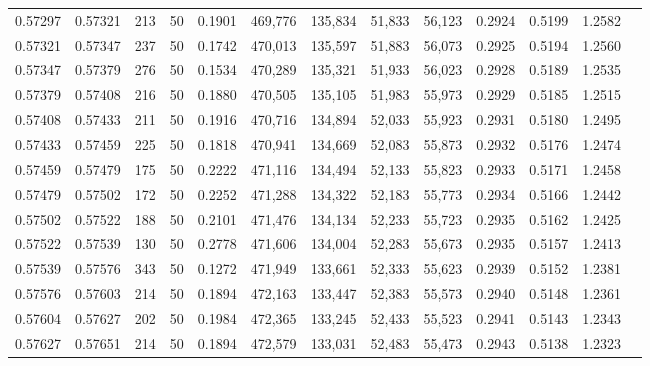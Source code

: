 \begin{tabular}{rrrrrrrrrrrrr}
0.57297 & 0.57321 &   213 &  50 &                                     0.1901 & 469,776 & 135,834 &  51,833 &  56,123 & 0.2924 & 0.5199 & 1.2582 \\
0.57321 & 0.57347 &   237 &  50 &                                     0.1742 & 470,013 & 135,597 &  51,883 &  56,073 & 0.2925 & 0.5194 & 1.2560 \\
0.57347 & 0.57379 &   276 &  50 &                                     0.1534 & 470,289 & 135,321 &  51,933 &  56,023 & 0.2928 & 0.5189 & 1.2535 \\
0.57379 & 0.57408 &   216 &  50 &                                     0.1880 & 470,505 & 135,105 &  51,983 &  55,973 & 0.2929 & 0.5185 & 1.2515 \\
0.57408 & 0.57433 &   211 &  50 &                                     0.1916 & 470,716 & 134,894 &  52,033 &  55,923 & 0.2931 & 0.5180 & 1.2495 \\
0.57433 & 0.57459 &   225 &  50 &                                     0.1818 & 470,941 & 134,669 &  52,083 &  55,873 & 0.2932 & 0.5176 & 1.2474 \\
0.57459 & 0.57479 &   175 &  50 &                                     0.2222 & 471,116 & 134,494 &  52,133 &  55,823 & 0.2933 & 0.5171 & 1.2458 \\
0.57479 & 0.57502 &   172 &  50 &                                     0.2252 & 471,288 & 134,322 &  52,183 &  55,773 & 0.2934 & 0.5166 & 1.2442 \\
0.57502 & 0.57522 &   188 &  50 &                                     0.2101 & 471,476 & 134,134 &  52,233 &  55,723 & 0.2935 & 0.5162 & 1.2425 \\
0.57522 & 0.57539 &   130 &  50 &                                     0.2778 & 471,606 & 134,004 &  52,283 &  55,673 & 0.2935 & 0.5157 & 1.2413 \\
0.57539 & 0.57576 &   343 &  50 &                                     0.1272 & 471,949 & 133,661 &  52,333 &  55,623 & 0.2939 & 0.5152 & 1.2381 \\
0.57576 & 0.57603 &   214 &  50 &                                     0.1894 & 472,163 & 133,447 &  52,383 &  55,573 & 0.2940 & 0.5148 & 1.2361 \\
0.57604 & 0.57627 &   202 &  50 &                                     0.1984 & 472,365 & 133,245 &  52,433 &  55,523 & 0.2941 & 0.5143 & 1.2343 \\
0.57627 & 0.57651 &   214 &  50 &                                     0.1894 & 472,579 & 133,031 &  52,483 &  55,473 & 0.2943 & 0.5138 & 1.2323 \\

\end{tabular}

